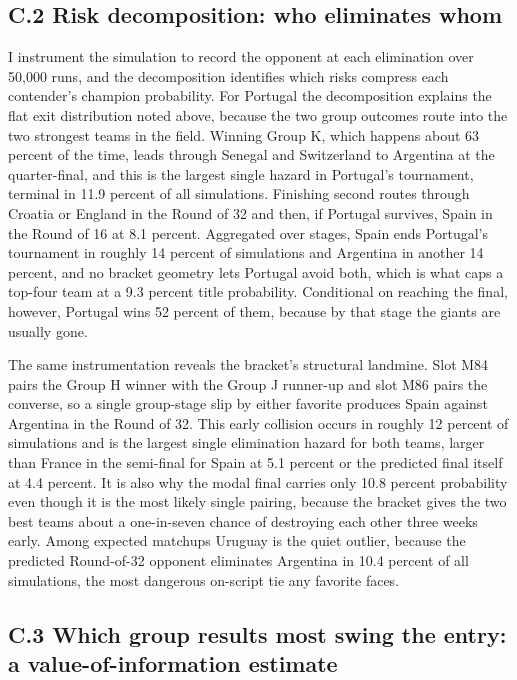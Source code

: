 \documentclass[11pt,a4paper]{article}
\begin{document}
\subsection*{C.2 \quad Risk decomposition: who eliminates whom}

I instrument the simulation to record the opponent at each elimination over 50{,}000 runs, and the decomposition identifies which risks compress each contender's champion probability. For Portugal the decomposition explains the flat exit distribution noted above, because the two group outcomes route into the two strongest teams in the field. Winning Group K, which happens about 63 percent of the time, leads through Senegal and Switzerland to Argentina at the quarter-final, and this is the largest single hazard in Portugal's tournament, terminal in 11.9 percent of all simulations. Finishing second routes through Croatia or England in the Round of 32 and then, if Portugal survives, Spain in the Round of 16 at 8.1 percent. Aggregated over stages, Spain ends Portugal's tournament in roughly 14 percent of simulations and Argentina in another 14 percent, and no bracket geometry lets Portugal avoid both, which is what caps a top-four team at a 9.3 percent title probability. Conditional on reaching the final, however, Portugal wins 52 percent of them, because by that stage the giants are usually gone.

The same instrumentation reveals the bracket's structural landmine. Slot M84 pairs the Group H winner with the Group J runner-up and slot M86 pairs the converse, so a single group-stage slip by either favorite produces Spain against Argentina in the Round of 32. This early collision occurs in roughly 12 percent of simulations and is the largest single elimination hazard for both teams, larger than France in the semi-final for Spain at 5.1 percent or the predicted final itself at 4.4 percent. It is also why the modal final carries only 10.8 percent probability even though it is the most likely single pairing, because the bracket gives the two best teams about a one-in-seven chance of destroying each other three weeks early. Among expected matchups Uruguay is the quiet outlier, because the predicted Round-of-32 opponent eliminates Argentina in 10.4 percent of all simulations, the most dangerous on-script tie any favorite faces.


\subsection*{C.3 \quad Which group results most swing the entry: a value-of-information estimate}
\end{document}
